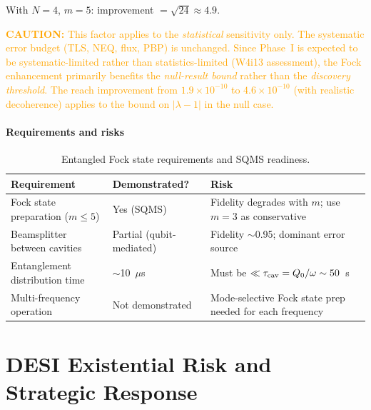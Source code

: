 \documentclass[11pt]{article}
\newcommand{\lbone}{|\lambda - 1|}
\newcommand{\ee}[1]{\times 10^{#1}}
\newcommand{\caution}[1]{\textcolor{orange}{\textbf{CAUTION:} #1}}
\theoremstyle{definition}
\theoremstyle{remark}
\begin{document}
With $N = 4$, $m = 5$: improvement $= \sqrt{24} \approx 4.9$.

\caution{This factor applies to the \emph{statistical} sensitivity
only. The systematic error budget (TLS, NEQ, flux, PBP) is unchanged.
Since Phase~I is expected to be systematic-limited rather than
statistics-limited (W4i13 assessment), the Fock enhancement primarily
benefits the \emph{null-result bound} rather than the \emph{discovery
threshold}. The reach improvement from $1.9\ee{-10}$ to $4.6\ee{-10}$
(with realistic decoherence) applies to the bound on $\lbone$ in the
null case.}

\subsection{Requirements and risks}

\begin{table}[H]
\centering
\caption{Entangled Fock state requirements and SQMS readiness.}
\label{tab:fock_requirements}
\renewcommand{\arraystretch}{1.25}
\begin{tabular}{@{}p{4cm}p{3cm}p{5cm}@{}}
\toprule
\textbf{Requirement} & \textbf{Demonstrated?} & \textbf{Risk} \\
\midrule
Fock state preparation ($m \leq 5$) & Yes (SQMS) &
  Fidelity degrades with $m$; use $m = 3$ as conservative \\
Beamsplitter between cavities & Partial (qubit-mediated) &
  Fidelity $\sim$0.95; dominant error source \\
Entanglement distribution time & $\sim$10~$\mu$s &
  Must be $\ll \tau_{\rm cav} = Q_0/\omega \sim 50$~s \\
Multi-frequency operation & Not demonstrated &
  Mode-selective Fock state prep needed for each frequency \\
\bottomrule
\end{tabular}
\end{table}


\part{DESI Existential Risk and Strategic Response}
\label{part:desi}
\end{document}
